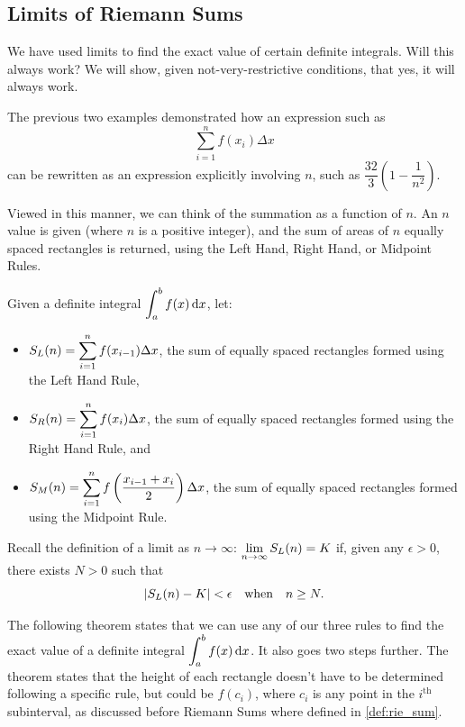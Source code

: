 \subsection{Limits of Riemann Sums}

We have used limits to find the exact value of certain definite integrals. Will this always work? We will show, given not-very-restrictive conditions, that yes, it will always work.

The previous two examples demonstrated how an expression such as
\[\sum_{i=1}^n f(x_i)\Delta x\]
can be rewritten as an expression explicitly involving $n$, such as $\dfrac{32}3(1-\dfrac1{n^2})$.

Viewed in this manner, we can think of the summation as a function of $n$. An $n$ value is given (where $n$ is a positive integer), and the sum of areas of $n$ equally spaced rectangles is returned, using the Left Hand, Right Hand, or Midpoint Rules. 

Given a definite integral $\displaystyle\int_a^b f(x)\operatorname{d}\! x$, let:
\begin{itemize}
	\item	$\displaystyle S_L(n) = \sum_{i=1}^n f(x_{i-1})\Delta x$, the sum of equally spaced rectangles formed using the Left Hand Rule,
	\item	$\displaystyle S_R(n) = \sum_{i=1}^n f(x_i)\Delta x$, the sum of equally spaced rectangles formed using the Right Hand Rule, and
	\item	$\displaystyle S_M(n) = \sum_{i=1}^n f\left(\frac{x_{i-1}+x_i}{2}\right)\Delta x$, the sum of equally spaced rectangles formed using the Midpoint Rule.
\end{itemize}
	
Recall the definition of a limit as $n\to\infty$: $\displaystyle\lim_{n\to\infty}S_L(n) = K$ if, given any $\epsilon>0$, there exists $N>0$ such that
\[\left\lvert S_L(n)-K \right\rvert< \epsilon \quad \text{when}\quad n\geq N.\]

The following theorem states that we can use any of our three rules to find the exact value of a definite integral $\displaystyle\int_a^b f(x)\operatorname{d}\! x$. It also goes two steps further. The theorem states that the height of each rectangle doesn't have to be determined following a specific rule, but could be $f(c_i)$, where $c_i$ is any point in the $i^{\text{th}}$ subinterval, as discussed before Riemann Sums where defined in \autoref{def:rie_sum}.

